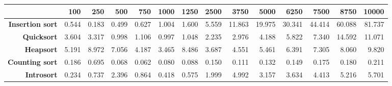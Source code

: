 \begin{tabular}{rrrrrrrrrrrrrr}
\hline
                         &   \textbf{100} &   \textbf{250} &   \textbf{500} &   \textbf{750} &   \textbf{1000} &   \textbf{1250} &   \textbf{2500} &   \textbf{3750} &   \textbf{5000} &   \textbf{6250} &   \textbf{7500} &   \textbf{8750} &   \textbf{10000} \\
\hline
 \textbf{Insertion sort} &          0.544 &          0.183 &          0.499 &          0.627 &           1.004 &           1.600 &           5.559 &          11.863 &          19.975 &          30.341 &          44.414 &          60.088 &           81.737 \\
      \textbf{Quicksort} &          3.604 &          3.317 &          0.998 &          1.106 &           0.997 &           1.048 &           2.235 &           2.976 &           4.188 &           5.822 &           7.340 &          14.592 &           11.071 \\
       \textbf{Heapsort} &          5.191 &          8.972 &          7.056 &          4.187 &           3.465 &           8.486 &           3.687 &           4.551 &           5.461 &           6.391 &           7.305 &           8.060 &            9.820 \\
  \textbf{Counting sort} &          0.186 &          0.695 &          0.068 &          0.062 &           0.080 &           0.088 &           0.150 &           0.111 &           0.132 &           0.149 &           0.175 &           0.180 &            0.211 \\
      \textbf{Introsort} &          0.234 &          0.737 &          2.396 &          0.864 &           0.418 &           0.575 &           1.999 &           4.992 &           3.157 &           3.634 &           4.413 &           5.216 &            5.701 \\
\hline
\end{tabular}